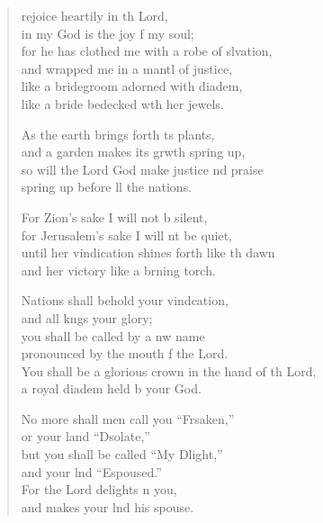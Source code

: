 \settowidth{\versewidth}{You shall be a glorious crown in the hand of the Lord, *}
\begin{verse}%
  \begin{patverse}
 rejoice heartily in th Lord,\Med\\
in my God is the joy f my soul;\\
for he has clothed me with a robe of slvation,\Med\\
and wrapped me in a mantl of justice,\\
like a bridegroom adorned with  diadem,\Med\\
like a bride bedecked w\pointup{\i}th her jewels.

As the earth brings forth \pointup{\i}ts plants,\Med\\
and a garden makes its grwth spring up,\\
so will the Lord God make justice nd praise\Med\\
spring up before ll the nations.

For Zion’s sake I will not b silent,\Med\\
for Jerusalem’s sake I will nt be quiet,\\
until her vindication shines forth like th dawn\Med\\
and her victory like a brning torch.

Nations shall behold your vind\pointup{\i}cation,\Med\\
and all k\pointup{\i}ngs your glory;\\
you shall be called by a nw name\Med\\
pronounced by the mouth f the Lord.\\
You shall be a glorious crown in the hand of th Lord,\Med\\
a royal diadem held b your God.

No more shall men call you “Frsaken,”\Med\\
or your land “Dsolate,”\\
but you shall be called “My Dlight,”\Med\\
and your lnd “Espoused.”\\
For the Lord delights \pointup{\i}n you,\Med\\
and makes your lnd his spouse.


\end{patverse}
\end{verse}
